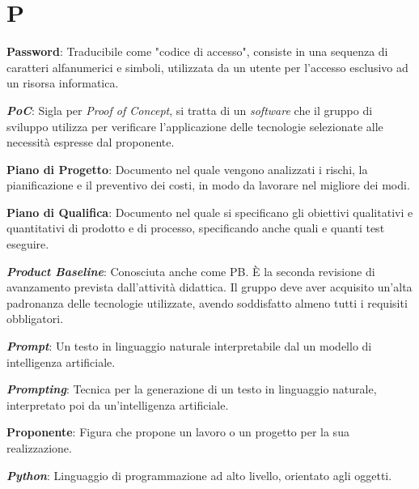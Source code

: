 \documentclass[5pt]{article}
\begin{document}
\section*{P}
\begin{flushleft}

\textbf{Password}: Traducibile come "codice di accesso", consiste in una sequenza di caratteri alfanumerici e simboli, utilizzata da un utente per l'accesso esclusivo ad un risorsa informatica. \newline

\textbf{\textit{PoC}}: Sigla per \textit{Proof of Concept}, si tratta di un \textit{software} che il gruppo di sviluppo utilizza per verificare l'applicazione delle tecnologie selezionate alle necessità espresse dal proponente.\newline

\textbf{Piano di Progetto}: Documento nel quale vengono analizzati i rischi, la pianificazione e il preventivo dei costi, in modo da lavorare nel migliore dei modi.\newline

\textbf{Piano di Qualifica}: Documento nel quale si specificano gli obiettivi qualitativi e quantitativi di prodotto e di processo, specificando anche quali e quanti test eseguire.\newline

\textbf{\textit{Product Baseline}}: Conosciuta anche come PB. È la seconda revisione di avanzamento prevista dall'attività didattica. Il gruppo deve aver acquisito un'alta padronanza delle tecnologie utilizzate, avendo soddisfatto almeno tutti i requisiti obbligatori.\newline

\textbf{\textit{Prompt}}: Un testo in linguaggio naturale interpretabile dal un modello di intelligenza artificiale.\newline

\textbf{\textit{Prompting}}: Tecnica per la generazione di un testo in linguaggio naturale, interpretato poi da un'intelligenza artificiale.\newline

\textbf{Proponente}: Figura che propone un lavoro o un progetto per la sua realizzazione. \newline

\textbf{\textit{Python}}: Linguaggio di programmazione ad alto livello, orientato agli oggetti.

\end{flushleft}
\end{document}
